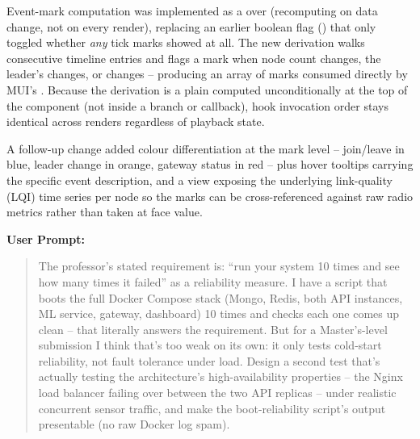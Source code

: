 \documentclass[conference]{IEEEtran}
\begin{document}
Event-mark computation was implemented as a \texttt{} over \texttt{} (recomputing on data change, not on every render), replacing an earlier boolean flag (\texttt{}) that only toggled whether \textit{any} tick marks showed at all. The new derivation walks consecutive timeline entries and flags a mark when node count changes, the leader's \texttt{} changes, or \texttt{} changes -- producing an array of \texttt{} marks consumed directly by MUI's \texttt{}. Because the derivation is a plain \texttt{} computed unconditionally at the top of the component (not inside a branch or callback), hook invocation order stays identical across renders regardless of playback state.

A follow-up change added colour differentiation at the mark level -- join/leave in blue, leader change in orange, gateway status in red -- plus hover tooltips carrying the specific event description, and a \texttt{} view exposing the underlying link-quality (LQI) time series per node so the marks can be cross-referenced against raw radio metrics rather than taken at face value.

\par\vspace{4pt}\par\vspace{2pt}

\noindent\textbf{User Prompt:}\par

\begin{quote}
The professor's stated requirement is: ``run your system 10 times and see how many times it failed'' as a reliability measure. I have a script that boots the full Docker Compose stack (Mongo, Redis, both API instances, ML service, gateway, dashboard) 10 times and checks each one comes up clean -- that literally answers the requirement. But for a Master's-level submission I think that's too weak on its own: it only tests cold-start reliability, not fault tolerance under load. Design a second test that's actually testing the architecture's high-availability properties -- the Nginx load balancer failing over between the two API replicas -- under realistic concurrent sensor traffic, and make the boot-reliability script's output presentable (no raw Docker log spam).
\end{quote}
\end{document}
